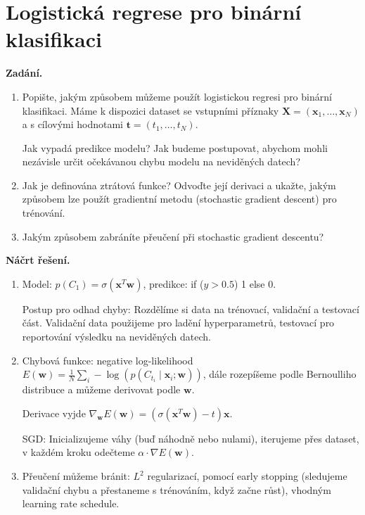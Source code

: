 \section{Logistická regrese pro binární klasifikaci}

\noindent\textbf{Zadání.}\par
\begin{enumerate}
  \item Popište, jakým způsobem můžeme použít logistickou regresi pro binární klasifikaci. Máme
    k dispozici dataset se vstupními příznaky $\boldsymbol{X} = (\boldsymbol{x}_1, \dots, \boldsymbol{x}_N)$
    a s cílovými hodnotami $\boldsymbol{t} = (t_1, \dots, t_N)$.

    Jak vypadá predikce modelu? Jak budeme postupovat, abychom mohli nezávisle určit očekávanou
    chybu modelu na neviděných datech?
  \item Jak je definována ztrátová funkce? Odvoďte její derivaci a ukažte, jakým způsobem lze
    použít gradientní metodu (stochastic gradient descent) pro trénování.
  \item Jakým způsobem zabráníte přeučení při stochastic gradient descentu?
\end{enumerate}

\medskip
\noindent\textbf{Náčrt řešení.}\par
\begin{enumerate}
  \item Model: $p(C_1) = \sigma(\boldsymbol{x}^T \boldsymbol{w})$, predikce: if ($y > 0.5$) 1 else 0.

    Postup pro odhad chyby: Rozdělíme si data na trénovací, validační a testovací část. Validační
    data použijeme pro ladění hyperparametrů, testovací pro reportování výsledku na neviděných datech.
  \item Chybová funkce: negative log-likelihood
    $E(\boldsymbol{w}) = \frac{1}{N} \sum_i -\log(p(C_{t_i} \mid \boldsymbol{x}_i; \boldsymbol{w}))$,
    dále rozepíšeme podle Bernoulliho distribuce a můžeme derivovat podle $\boldsymbol{w}$.

    Derivace vyjde $\nabla_{\boldsymbol{w}} E(\boldsymbol{w}) = (\sigma(\boldsymbol{x}^T \boldsymbol{w}) - t)\boldsymbol{x}$.

    SGD: Inicializujeme váhy (buď náhodně nebo nulami), iterujeme přes dataset, v každém kroku
    odečteme $\alpha \cdot \nabla E(\boldsymbol{w})$.
  \item Přeučení můžeme bránit: $L^2$ regularizací, pomocí early stopping (sledujeme validační
    chybu a přestaneme s trénováním, když začne růst), vhodným learning rate schedule.
\end{enumerate}

